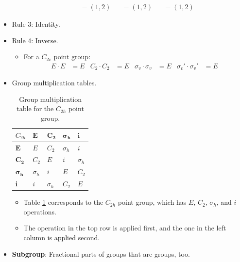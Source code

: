 \documentclass[../notes.tex]{subfiles}
\begin{document}
\begin{itemize}
\begin{itemize}
\begin{align*}
            &= (1,2)&
                &= (1,2)&
                    &= (1,2)
        \end{align*}
    \end{itemize}
    \item Rule 3: Identity.
    \item Rule 4: Inverse.
    \begin{itemize}
        \item For a $C_{2v}$ point group:
        \begin{align*}
            E\cdot E &= E&
            C_2\cdot C_2 &= E&
            \sigma_v\cdot\sigma_v &= E&
            \sigma_v'\cdot\sigma_v' &= E
        \end{align*}
    \end{itemize}
    \item Group multiplication tables.
    \begin{table}[H]
        \centering
        \renewcommand{\arraystretch}{1.4}
        \footnotesize
        \begin{tabular}{l|llll}
            \normalsize$C_{2h}$ & $\bm{E}$   & $\bm{C_2}$ & $\bm{\sigma_h}$ & $\bm{i}$\\
            \hline
            $\bm{E}$            & $E$        & $C_2$      & $\sigma_h$      & $i$\\
            $\bm{C_2}$          & $C_2$      & $E$        & $i$             & $\sigma_h$\\
            $\bm{\sigma_h}$     & $\sigma_h$ & $i$        & $E$             & $C_2$\\
            $\bm{i}$            & $i$        & $\sigma_h$ & $C_2$           & $E$\\
        \end{tabular}
        \caption{Group multiplication table for the $C_{2h}$ point group.}
        \label{tab:groupMultiplication-C2h}
    \end{table}
    \begin{itemize}
        \item Table \ref{tab:groupMultiplication-C2h} corresponds to the $C_{2h}$ point group, which has $E$, $C_2$, $\sigma_h$, and $i$ operations.
        \item The operation in the top row is applied first, and the one in the left column is applied second.
    \end{itemize}
    \item \textbf{Subgroup}: Fractional parts of groups that are groups, too.
    \begin{table}[h!]

\end{table}
\end{itemize}
\end{document}
